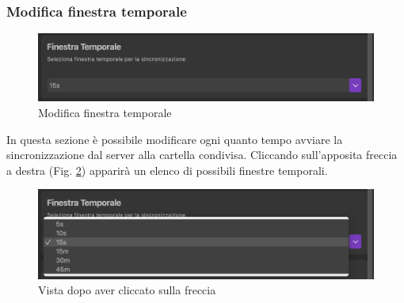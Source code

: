 \subsubsection{Modifica finestra temporale}
\label{sec:finestra temporale}
\begin{figure}[H]
    \centering
    \includegraphics[scale = 0.65]{components/img/ImpFinTempA.png}
    \caption{Modifica finestra temporale}
    \label{fig:finTempA}
\end{figure}
In questa sezione è possibile modificare ogni quanto tempo avviare la sincronizzazione dal server alla cartella condivisa. Cliccando sull'apposita freccia a destra (Fig. \ref{fig:finTempC}) apparirà un elenco di possibili finestre temporali. 
\begin{figure}[H]
    \centering
    \includegraphics[scale = 0.65]{components/img/ImpFinTempC.png}
    \caption{Vista dopo aver cliccato sulla freccia}
    \label{fig:finTempC}
\end{figure}


